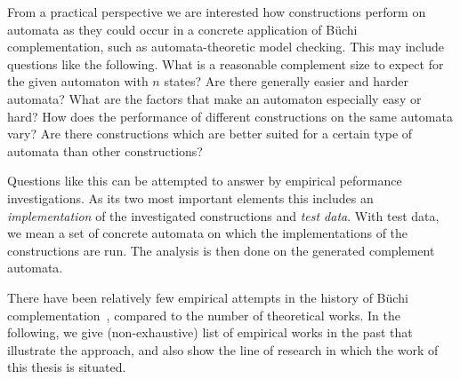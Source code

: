 From a practical perspective we are interested how constructions perform on automata as they could occur in a concrete application of Büchi complementation, such as automata-theoretic model checking. This may include questions like the following. What is a reasonable complement size to expect for the given automaton with $n$ states? Are there generally easier and harder automata? What are the factors that make an automaton especially easy or hard? How does the performance of different constructions on the same automata vary? Are there constructions which are better suited for a certain type of automata than other constructions?

Questions like this can be attempted to answer by empirical peformance investigations. As its two most important elements this includes an \textit{implementation} of the investigated constructions and \textit{test data}. With test data, we mean a set of concrete automata on which the implementations of the constructions are run. The analysis is then done on the generated complement automata.

There have been relatively few empirical attempts in the history of Büchi complementation~\cite{2011_tsai}, compared to the number of theoretical works. In the following, we give  (non-exhaustive) list of empirical works in the past that illustrate the approach, and also show the line of research in which the work of this thesis is situated.

